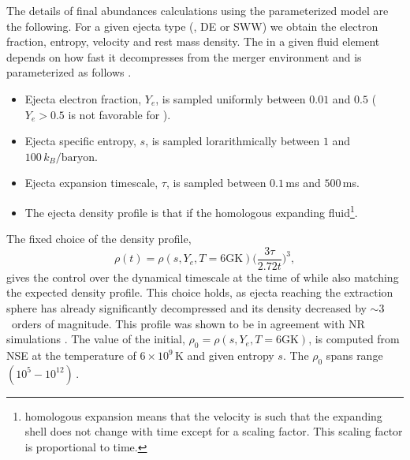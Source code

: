 The details of final abundances calculations using the parameterized model are the following. %
For a given ejecta type (\eg, \ac{DE} or \ac{SWW}) we obtain the electron fraction,
entropy, velocity and rest mass density. %
%
The \rproc{} in a given fluid element depends on how fast it decompresses from the 
merger environment and is parameterized as follows \citep{Lippuner:2015gwa}.
\begin{itemize}
    \setlength\itemsep{0.1em}
    \item Ejecta electron fraction, $Y_e$, is sampled uniformly between $0.01$ and $0.5$ 
    ($Y_e>0.5$ is not favorable for \rproc{}).
    \item Ejecta specific entropy, $s$, is sampled lorarithmically 
    between $1$ and $100\, k_B/\text{baryon}$.
    \item Ejecta expansion timescale, %
    $\tau$, is sampled between $0.1\,$ms and $500\,$ms.
    \item The ejecta density profile is that if the homologous expanding fluid\footnote{
        homologous expansion means that the velocity is such that the expanding shell 
        does not change with time except for a scaling factor. 
        This scaling factor is proportional to time.
    }.%
\end{itemize}
The fixed choice of the density profile,
\begin{equation}
\rho(t) = \rho(s, Y_e, T=6\text{GK})\Big(\frac{3\tau}{2.72 t}\Big)^3, 
\label{eq:nuc:rho_nuccalc}
\end{equation}
gives the control over the dynamical 
timescale at the time of \rproc{} while also matching the expected density profile.
%
This choice holds, as ejecta reaching the extraction sphere has already 
significantly decompressed and its density decreased by ${\sim}3$~orders of magnitude. 
%
This profile was shown to be in agreement with \ac{NR} simulations 
\citep{Lippuner:2015gwa,Foucart:2014nda}.
%
The value of the initial, 
$\rho_0 = \rho(s, Y_e, T=6\text{GK})$, 
is computed from \ac{NSE} 
at the temperature of $6\times10^9\,$K and given 
entropy $s$. The $\rho_0$ spans range $(10^5 - 10^{12})\,$\gcm.
%

